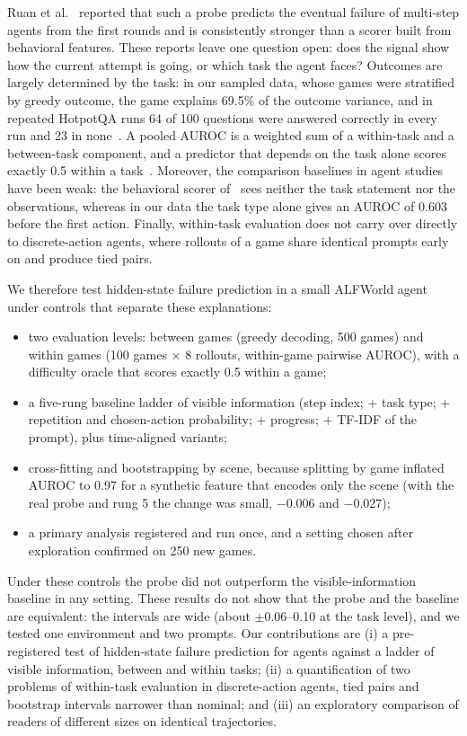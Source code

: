 \documentclass[10pt]{article}
\begin{document}
Ruan et al.~\cite{ruan2026doomed} reported that such a probe predicts the eventual failure of multi-step agents from the first rounds and is consistently stronger than a scorer built from behavioral features.
These reports leave one question open: does the signal show how the current attempt is going, or which task the agent faces?
Outcomes are largely determined by the task: in our sampled data, whose games were stratified by greedy outcome, the game explains 69.5\% of the outcome variance, and in repeated HotpotQA runs 64 of 100 questions were answered correctly in every run and 23 in none~\cite{mehta2026commit}.
A pooled AUROC is a weighted sum of a within-task and a between-task component, and a predictor that depends on the task alone scores exactly 0.5 within a task~\cite{bulut2026problem}.
Moreover, the comparison baselines in agent studies have been weak: the behavioral scorer of~\cite{ruan2026doomed} sees neither the task statement nor the observations, whereas in our data the task type alone gives an AUROC of 0.603 before the first action.
Finally, within-task evaluation does not carry over directly to discrete-action agents, where rollouts of a game share identical prompts early on and produce tied pairs.

We therefore test hidden-state failure prediction in a small ALFWorld agent~\cite{shridhar2021alfworld} under controls that separate these explanations:
\begin{itemize}
\item two evaluation levels: between games (greedy decoding, 500 games) and within games (100 games $\times$ 8 rollouts, within-game pairwise AUROC), with a difficulty oracle that scores exactly 0.5 within a game;
\item a five-rung baseline ladder of visible information (step index; + task type; + repetition and chosen-action probability; + progress; + TF-IDF of the prompt), plus time-aligned variants;
\item cross-fitting and bootstrapping by scene, because splitting by game inflated AUROC to 0.97 for a synthetic feature that encodes only the scene (with the real probe and rung 5 the change was small, $-0.006$ and $-0.027$);
\item a primary analysis registered and run once, and a setting chosen after exploration confirmed on 250 new games.
\end{itemize}
Under these controls the probe did not outperform the visible-information baseline in any setting. These results do not show that the probe and the baseline are equivalent: the intervals are wide (about $\pm$0.06--0.10 at the task level), and we tested one environment and two prompts.
Our contributions are (i) a pre-registered test of hidden-state failure prediction for agents against a ladder of visible information, between and within tasks; (ii) a quantification of two problems of within-task evaluation in discrete-action agents, tied pairs and bootstrap intervals narrower than nominal; and (iii) an exploratory comparison of readers of different sizes on identical trajectories.
\end{document}
